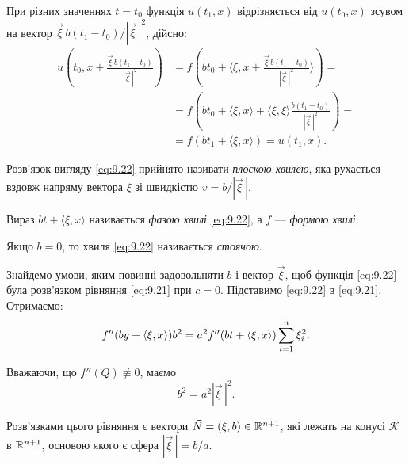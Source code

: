 При різних значеннях $t = t_0$ функція $u(t_1, x)$ відрізняється від $u(t_0, x)$ зсувом на вектор $\vec \xi \, b (t_1 - t_0) / \left|\vec \xi \, \right|^2$, дійсно:
\begin{equation}
    \begin{aligned}
        u \left(t_0, x + \frac{\vec \xi \, b (t_1 - t_0)}{\left|\vec \xi\,\right|^2} \right) &= f \left(b t_0 + \langle \xi, x + \frac{\vec \xi \, b (t_1 - t_0)}{\left|\vec \xi\,\right|^2} \rangle \right) = \\
        &= f \left( b t_0 + \langle \xi, x\rangle + \langle \xi, \xi \rangle \frac{b (t_1 - t_0)}{\left|\vec \xi\,\right|^2} \right) = \\
        &= f (b t_1 + \langle \xi, x\rangle) = u(t_1, x).
    \end{aligned}
\end{equation}

\begin{definition}
    Розв'язок вигляду \eqref{eq:9.22} прийнято називати \textit{плоскою хвилею}, яка рухається вздовж напряму вектора $\xi$ зі швидкістю $v = b / \left|\vec \xi\,\right|$.    
\end{definition}

\begin{definition}
    Вираз $b t + \langle \xi, x \rangle$ називається \textit{фазою хвилі} \eqref{eq:9.22}, а $f$ --- \textit{формою хвилі}. 
\end{definition}

\begin{definition}
    Якщо $b = 0$, то хвиля \eqref{eq:9.22} називається \textit{стоячою}.
\end{definition}

Знайдемо умови, яким повинні задовольняти $b$ і вектор $\vec \xi$, щоб функція \eqref{eq:9.22} була розв'язком рівняння \eqref{eq:9.21} при $c = 0$. Підставимо \eqref{eq:9.22} в \eqref{eq:9.21}. Отримаємо: 
\begin{equation}
    f'' (b y + \langle \xi, x \rangle) b^2 = a^2 f''(b t + \langle \xi, x \rangle) \Sum_{i = 1}^n \xi_i^2.
\end{equation}

Вважаючи, що $f''(Q) \not\equiv 0$, маємо
\begin{equation}
    \label{eq:9.23}
    b^2 = a^2 \left| \vec \xi \, \right|^2.
\end{equation}

Розв'язками цього рівняння є вектори $\vec N = (\xi, b) \in \mathbb{R}^{n + 1}$, які лежать на конусі $\mathcal{K}$ в $\mathbb{R}^{n + 1}$, основою якого є сфера $\left| \vec \xi \, \right| = b / a$. 

